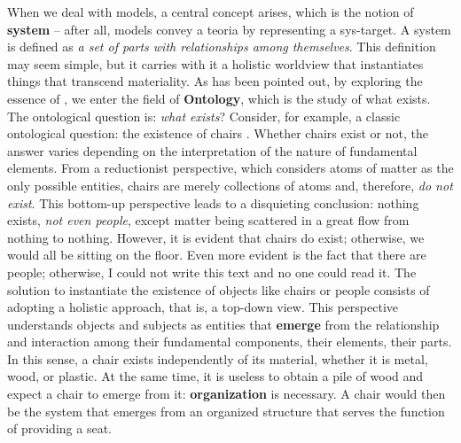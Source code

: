 \documentclass[./main_en.tex]{subfiles}
\begin{document}
\par When we deal with models, a central concept arises, which is the notion of \textbf{\gls{system}} – after all, models convey a \gls{teoria} by representing a \gls{sys-target}. A \gls{system} is defined as \textit{a set of parts with relationships among themselves}. This definition may seem simple, but it carries with it a holistic worldview that instantiates things that transcend materiality. As has been pointed out, by exploring the essence of , we enter the field of \textbf{Ontology}, which is the study of what exists. The ontological question is: \textit{what exists}? Consider, for example, a classic ontological question: the existence of chairs \cite{bradley2019}. Whether chairs exist or not, the answer varies depending on the interpretation of the nature of fundamental elements. From a reductionist perspective, which considers atoms of matter as the only possible entities, chairs are merely collections of atoms and, therefore, \textit{do not exist}. This bottom-up perspective leads to a disquieting conclusion: nothing exists, \textit{not even people}, except matter being scattered in a great flow from nothing to nothing. However, it is evident that chairs do exist; otherwise, we would all be sitting on the floor. Even more evident is the fact that there are people; otherwise, I could not write this text and no one could read it. The solution to instantiate the existence of objects like chairs or people consists of adopting a holistic approach, that is, a top-down view. This perspective understands objects and subjects as entities that \textbf{emerge} from the relationship and interaction among their fundamental components, their elements, their parts. In this sense, a chair exists independently of its material, whether it is metal, wood, or plastic. At the same time, it is useless to obtain a pile of wood and expect a chair to emerge from it: \textbf{organization} is necessary. A chair would then be the \gls{system} that emerges from an organized structure that serves the function of providing a seat.
\end{document}
